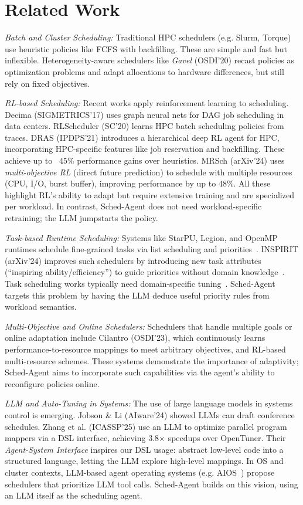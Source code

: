 \section{Related Work}

\emph{Batch and Cluster Scheduling:} Traditional HPC schedulers (e.g. Slurm, Torque) use heuristic policies like FCFS with backfilling. These are simple and fast but inflexible. Heterogeneity-aware schedulers like \emph{Gavel} (OSDI'20) recast policies as optimization problems and adapt allocations to hardware differences, but still rely on fixed objectives.

\emph{RL-based Scheduling:} Recent works apply reinforcement learning to scheduling. Decima (SIGMETRICS'17) uses graph neural nets for DAG job scheduling in data centers. RLScheduler (SC'20) learns HPC batch scheduling policies from traces. DRAS (IPDPS'21) introduces a hierarchical deep RL agent for HPC, incorporating HPC-specific features like job reservation and backfilling. These achieve up to ~45\% performance gains over heuristics. MRSch (arXiv'24) uses \emph{multi-objective RL} (direct future prediction) to schedule with multiple resources (CPU, I/O, burst buffer), improving performance by up to 48\%. All these highlight RL's ability to adapt but require extensive training and are specialized per workload. In contrast, Sched-Agent does not need workload-specific retraining; the LLM jumpstarts the policy.

\emph{Task-based Runtime Scheduling:} Systems like StarPU, Legion, and OpenMP runtimes schedule fine-grained tasks via list scheduling and priorities~\cite{arxiv2404}. INSPIRIT (arXiv'24) improves such schedulers by introducing new task attributes (``inspiring ability/efficiency'') to guide priorities without domain knowledge~\cite{arxiv2404b}. Task scheduling works typically need domain-specific tuning~\cite{arxiv2404c}. Sched-Agent targets this problem by having the LLM deduce useful priority rules from workload semantics.

\emph{Multi-Objective and Online Schedulers:} Schedulers that handle multiple goals or online adaptation include Cilantro (OSDI'23), which continuously learns performance-to-resource mappings to meet arbitrary objectives, and RL-based multi-resource schemes. These systems demonstrate the importance of adaptivity; Sched-Agent aims to incorporate such capabilities via the agent's ability to reconfigure policies online.

\emph{LLM and Auto-Tuning in Systems:} The use of large language models in systems control is emerging. Jobson \& Li (AIware'24) showed LLMs can draft conference schedules. Zhang et al. (ICASSP'25) use an LLM to optimize parallel program mappers via a DSL interface, achieving 3.8$\times$ speedups over OpenTuner. Their \emph{Agent-System Interface} inspires our DSL usage: abstract low-level code into a structured language, letting the LLM explore high-level mappings. In OS and cluster contexts, LLM-based agent operating systems (e.g. AIOS~\cite{arxiv2403}) propose schedulers that prioritize LLM tool calls. Sched-Agent builds on this vision, using an LLM itself as the scheduling agent.

